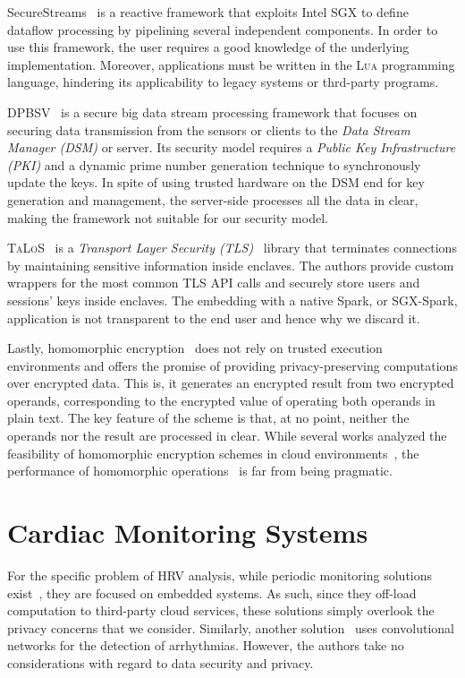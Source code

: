 SecureStreams~\cite{Havet2017} is a reactive framework that exploits Intel SGX to define dataflow processing by pipelining several independent components. 
In order to use this framework, the user requires a good knowledge of the underlying implementation. 
Moreover, applications must be written in the \textsc{Lua} programming language, hindering its applicability to legacy systems or thrd-party programs.

\textsc{DPBSV}~\cite{Puthal2015} is a secure big data stream processing framework that focuses on securing data transmission from the sensors or clients to the \textit{Data Stream Manager (DSM)} or server. 
Its security model requires a \textit{Public Key Infrastructure (PKI)} and a dynamic prime number generation technique to synchronously update the keys. 
In spite of using trusted hardware on the DSM end for key generation and management, the server-side processes all the data in clear, making the framework not suitable for our security model. 

\textsc{TaLoS}~\cite{Aublin2017} is a \textit{Transport Layer Security (TLS)}~\cite{Dierks2008} library that terminates connections by maintaining sensitive information inside enclaves. 
The authors provide custom wrappers for the most common \textsc{TLS} API calls and securely store users and sessions' keys inside enclaves.
The embedding with a native Spark, or SGX-Spark, application is not transparent to the end user and hence why we discard it.

Lastly, homomorphic encryption~\cite{Gentry2009} does not rely on trusted execution environments and offers the promise of providing privacy-preserving computations over encrypted data.
This is, it generates an encrypted result from two encrypted operands, corresponding to the encrypted value of operating both operands in plain text.
The key feature of the scheme is that, at no point, neither the operands nor the result are processed in clear.
While several works analyzed the feasibility of homomorphic encryption schemes in cloud environments~\cite{Tetali2013,Stephen2016}, the performance of homomorphic operations~\cite{Gottel2018} is far from being pragmatic.

\section{Cardiac Monitoring Systems} \label{sec:related:cardiac}
For the specific problem of HRV analysis, while periodic monitoring solutions exist~\cite{Renevey2018}, they are focused on embedded systems.
As such, since they off-load computation to third-party cloud services, these solutions simply overlook the privacy concerns that we consider.
Similarly, another solution~\cite{VanZaen2019} uses convolutional networks for the detection of arrhythmias.
However, the authors take no considerations with regard to data security and privacy.

